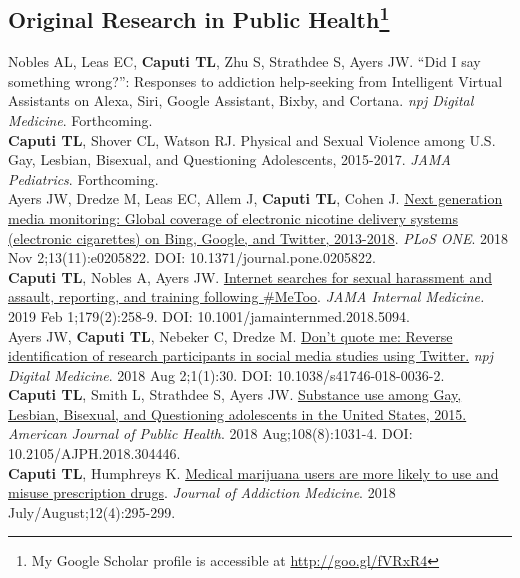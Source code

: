 \documentclass[10pt, letterpaper]{article}
\newcommand{\years}[1]{\marginnote{\normalsize #1}}
\begin{document}
\subsection*{Original Research in Public Health\footnote{My Google Scholar profile is accessible at \href{http://goo.gl/fVRxR4}{http://goo.gl/fVRxR4}}}
\noindent
\years{2019}Nobles AL, Leas EC, \textbf{Caputi TL}, Zhu S, Strathdee S, Ayers JW. “Did I say something wrong?”: Responses to addiction help-seeking from Intelligent Virtual Assistants on Alexa, Siri, Google Assistant, Bixby, and Cortana. \textit{npj Digital Medicine}. Forthcoming.\\[.2cm]
\years{2019}\textbf{Caputi TL}, Shover CL, Watson RJ. Physical and Sexual Violence among U.S. Gay, Lesbian, Bisexual, and Questioning Adolescents, 2015-2017. \textit{JAMA Pediatrics}. Forthcoming.\\[.2cm]
\years{2018}Ayers JW, Dredze M, Leas EC, Allem J, \textbf{Caputi TL},  Cohen J. \href{https://dx.doi.org/10.1371/journal.pone.0205822}{Next generation media monitoring: Global coverage of electronic nicotine delivery systems (electronic cigarettes) on Bing, Google, and Twitter, 2013-2018}. \textit{PLoS ONE}. 2018 Nov 2;13(11):e0205822. DOI: 10.1371/journal.pone.0205822.\\[.2cm]
\years{2018}\textbf{Caputi TL}, Nobles A, Ayers JW. \href{https://dx.doi.org/10.1001/jamainternmed.2018.5094}{Internet searches for sexual harassment and assault, reporting, and training following \#MeToo}. \textit{JAMA Internal Medicine.} 2019 Feb 1;179(2):258-9. DOI: 10.1001/jamainternmed.2018.5094.\\[.2cm]
\years{2018}Ayers JW, \textbf{Caputi TL}, Nebeker C, Dredze M. \href{https://dx.doi.org/10.1038/s41746-018-0036-2}{Don't quote me: Reverse identification of research participants in social media studies using Twitter.} \textit{npj Digital Medicine}. 2018 Aug 2;1(1):30. DOI: 10.1038/s41746-018-0036-2.\\[.2cm]
\years{2018}\textbf{Caputi TL}, Smith L, Strathdee S, Ayers JW. \href{http://dx.doi.org/10.2105/AJPH.2018.304446}{Substance use among Gay, Lesbian, Bisexual, and Questioning adolescents in the United States, 2015.} \textit{American Journal of Public Health}. 2018 Aug;108(8):1031-4. DOI: 10.2105/AJPH.2018.304446.\\[.2cm]
\years{2018}\textbf{Caputi TL}, Humphreys K. \href{http://dx.doi.org/10.1097/ADM.0000000000000405}{Medical marijuana users are more likely to use and misuse prescription drugs}.  \textit{Journal of Addiction Medicine}. 2018 July/August;12(4):295-299. \\
\end{document}
